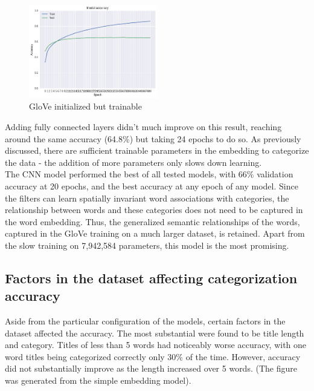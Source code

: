 \documentclass[jou,apacite, 10px]{apa6}
\begin{document}
\begin{figure}[h!]
\captionsetup{justification=centering}
    \centering
     \includegraphics[width=0.5\textwidth]{images/Training-GloveTrainable}
        \caption{GloVe initialized but trainable}
\end{figure}

Adding fully connected layers didn't much improve on this result, reaching around the same accuracy (64.8\%) but taking 24 epochs to do so. As previously discussed, there are sufficient trainable parameters in the embedding to categorize the data - the addition of more parameters only slows down learning.\\

The CNN model performed the best of all tested models, with 66\% validation accuracy at 20 epochs, and the best accuracy at any epoch of any model. Since the filters can learn spatially invariant word associations with categories, the relationship between words and these categories does not need to be captured in the word embedding. Thus, the generalized semantic relationships of the words, captured in the GloVe training on a much larger dataset, is retained. Apart from the slow training on 7,942,584 parameters, this model is the most promising.\\

\subsection{Factors in the dataset affecting categorization accuracy}
Aside from the particular configuration of the models, certain factors in the dataset affected the accuracy. The most substantial were found to be title length and category. Titles of less than 5 words had noticeably worse accuracy, with one word titles being categorized correctly only 30\% of the time. However, accuracy did not substantially improve as the length increased over 5 words. (The figure was generated from the simple embedding model).\\
\end{document}
